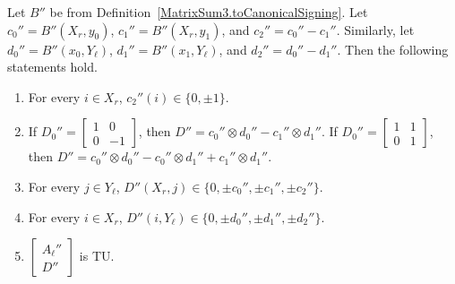 \begin{lemma}
    \label{lem:three_sum_signing_B_props}
    \leanok
    Let $B''$ be from Definition~\ref{MatrixSum3.toCanonicalSigning}. Let $c_{0}'' = B'' (X_{r}, y_{0})$, $c_{1}'' = B'' (X_{r}, y_{1})$, and $c_{2}'' = c_{0}'' - c_{1}''$. Similarly, let $d_{0}'' = B'' (x_{0}, Y_{\ell})$, $d_{1}'' = B'' (x_{1}, Y_{\ell})$, and $d_{2}'' = d_{0}'' - d_{1}''$. Then the following statements hold.
    \begin{enumerate}
        \item\label{item:tss_Bp_c2} For every $i \in X_{r}$, $c_{2}'' (i) \in \{0, \pm 1\}$.
        \item\label{item:tss_Bp_Deq} If $D_{0}'' = \begin{bmatrix} 1 & 0 \\ 0 & -1 \end{bmatrix}$, then $D'' = c_{0}'' \otimes d_{0}'' - c_{1}'' \otimes d_{1}''$. If $D_{0}'' = \begin{bmatrix} 1 & 1 \\ 0 & 1 \end{bmatrix}$, then $D'' = c_{0}'' \otimes d_{0}'' - c_{0}'' \otimes d_{1}'' + c_{1}'' \otimes d_{1}''$.
        \item\label{item:tss_Bp_Dcols} For every $j \in Y_{\ell}$, $D'' (X_{r}, j) \in \{0, \pm c_{0}'', \pm c_{1}'', \pm c_{2}''\}$.
        \item\label{item:tss_Bp_Drows} For every $i \in X_{r}$, $D'' (i, Y_{\ell}) \in \{0, \pm d_{0}'', \pm d_{1}'', \pm d_{2}''\}$.
        \item\label{item:tss_Bp_AlD} $\begin{bmatrix} A_{\ell}'' \\ D'' \end{bmatrix}$ is TU.
    \end{enumerate}
\end{lemma}

